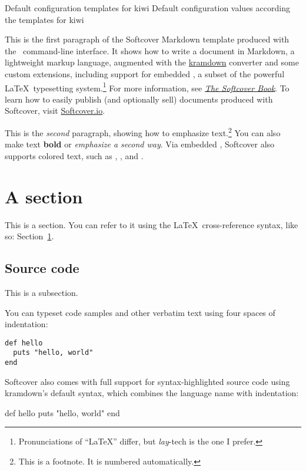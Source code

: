 Default configuration templates for kiwi
Default configuration values according the templates for kiwi

This is the first paragraph of the Softcover Markdown template produced with the \softcover\ command-line interface. It shows how to write a document in Markdown, a lightweight markup language, augmented with the \href{http://kramdown.gettalong.org/}{kramdown} converter and some custom extensions, including support for embedded \PolyTeX, a subset of the powerful \LaTeX\ typesetting system.\footnote{Pronunciations of ``LaTeX'' differ, but \emph{lay}-tech is the one I prefer.} For more information, see \href{http://manual.softcover.io/book}{\emph{The Softcover Book}}. To learn how to easily publish (and optionally sell) documents produced with Softcover, visit \href{http://softcover.io/}{Softcover.io}.

This is the \emph{second} paragraph, showing how to emphasize text.\footnote{This is a footnote. It is numbered automatically.} You can also make text \textbf{bold} or \emph{emphasize a second way}. Via embedded \PolyTeX, Softcover also supports colored text, such as , , and .

\section{A section}

\label{sec:a_section}

This is a section. You can refer to it using the \LaTeX\ cross-reference syntax, like so: Section~\ref{sec:a_section}.

\subsection{Source code}

This is a subsection.

You can typeset code samples and other verbatim text using four spaces of indentation:

\begin{verbatim}
def hello
  puts "hello, world"
end
\end{verbatim}

Softcover also comes with full support for syntax-highlighted source code using kramdown's default syntax, which combines the language name with indentation:

\begin{code}
def hello
  puts "hello, world"
end
\end{code}

